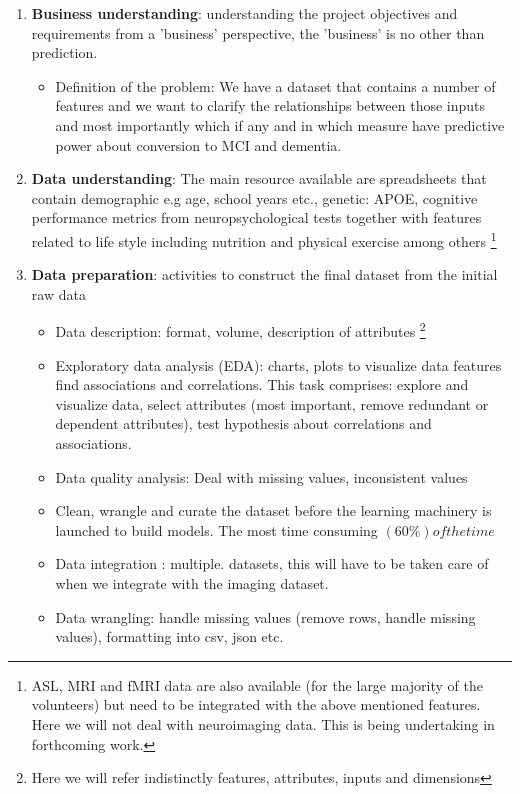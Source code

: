 \documentclass[11pt]{article}
\begin{document}
\begin{enumerate}
\item \textbf{Business understanding}: understanding the project objectives and requirements from a 'business' perspective, the 'business' is no other than prediction. 
	\begin{itemize}
		\item Definition of the problem: We have a dataset that contains a number of features and we want to clarify the relationships between those inputs and most importantly which if any and in which measure have predictive power about conversion to MCI and dementia.
	\end{itemize}
\item \textbf{Data understanding}: The main resource available are spreadsheets that contain demographic e.g age, school years etc., genetic: APOE, cognitive performance metrics from neuropsychological tests together with features related to life style including nutrition and physical exercise among others \footnote{ASL, MRI and fMRI data are also available (for the large majority of the volunteers) but need to be integrated with the above mentioned features. Here we will not deal with neuroimaging data. This is being undertaking in forthcoming work.}
\item \textbf{Data preparation}: activities to construct the final dataset from the initial raw data
	\begin{itemize}
		\item Data description: format, volume, description of attributes \footnote{Here we will refer indistinctly features, attributes, inputs and dimensions}
		\item Exploratory data analysis (EDA): charts, plots to visualize data features find associations and correlations. This task comprises: explore and visualize data, select attributes (most important, remove redundant or dependent attributes), test hypothesis about correlations and associations.
		\item Data quality analysis: Deal with missing values, inconsistent values
		\item Clean, wrangle and curate the dataset before the learning machinery is launched to build models. The most time consuming $(60\%) of the time$
		\item Data integration : multiple. datasets, this will have to be taken care of when we integrate with the imaging dataset.
		\item Data wrangling: handle missing values (remove rows, handle missing values), formatting into csv, json etc.

\end{itemize}
\end{enumerate}
\end{document}
